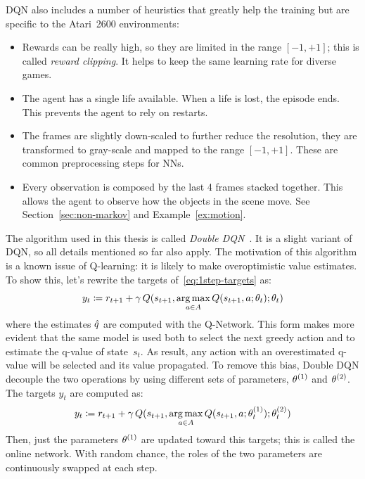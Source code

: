 DQN also includes a number of heuristics that greatly help the training
but are specific to the Atari~2600 environments:
\begin{itemize}
	\item Rewards can be really high, so they are limited in the range $[-1,
		+1]$; this is called \emph{reward clipping}. It helps to keep the same
		learning rate for diverse games.
	\item The agent has a single life available. When a life is lost, the
		episode ends. This prevents the agent to rely on restarts.
	\item The frames are slightly down-scaled to further reduce the resolution,
		they are transformed to gray-scale and mapped to the range $[-1, +1]$.
		These are common preprocessing steps for NNs.
	\item Every observation is composed by the last 4 frames stacked together.
		This allows the agent to observe how the objects in the scene move.
		See Section~\ref{sec:non-markov} and Example~\vref{ex:motion}.
\end{itemize}

The algorithm used in this thesis is called \emph{Double
DQN}~\cite{bib:double-q}. It is a slight variant of DQN, so all details
mentioned so far also apply. The motivation of this algorithm is a known issue
of Q-learning: it is likely to make overoptimistic value estimates.
To show this, let's rewrite the targets of~\eqref{eq:1step-targets} as:
\begin{equation}
	y_t \coloneqq r_{t+1} + \gamma \, Q(s_{t+1}, \operatorname*{arg\,max}_{a \in A} Q(s_{t+1},
	a; \theta_t); \theta_t)
\end{equation}
where the estimates $\hat{q}$ are computed with the Q-Network. This form makes
more evident that the same model is used both to select the next greedy action
and to estimate the q-value of state~$s_t$. As result, any action with an
overestimated q-value will be selected and its value propagated. To remove
this bias, Double DQN decouple the two operations by using different sets of
parameters, $\theta^{(1)}$ and $\theta^{(2)}$. The targets $y_t$ are
computed as:
\begin{equation}
	y_t \coloneqq r_{t+1} + \gamma \, Q(s_{t+1}, \operatorname*{arg\,max}_{a \in A} Q(s_{t+1},
	a; \theta_t^{(1)}); \theta_t^{(2)})
	\label{eq:double-q-targets}
\end{equation}
Then, just the parameters $\theta^{(1)}$ are updated toward this targets;
this is called the online network. With random chance, the roles of the two
parameters are continuously swapped at each step.

